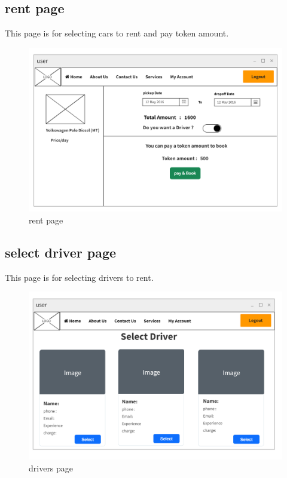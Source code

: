 \documentclass[a4paper,12pt,toc=flat]{report}
\begin{document}
	\pagebreak
	
		\subsection{rent page}
\hspace*{12pt}
        This page is for selecting cars to rent and pay token amount.
	\begin{figure}[bph]
	\begin{center}
		\includegraphics[width=1.1 \linewidth, height=0.7\textheight]{"user_rent.png"}
	\end{center}
		\caption{ rent page}
	\end{figure}

	\pagebreak
	
	
		\subsection{select driver page}
\hspace*{12pt}
        This page is for selecting drivers to rent.
	\begin{figure}[bph]
	\begin{center}
		\includegraphics[width=1.1 \linewidth, height=0.7\textheight]{"user_driver.png"}
	\end{center}
		\caption{ drivers page}
	\end{figure}
\end{document}
